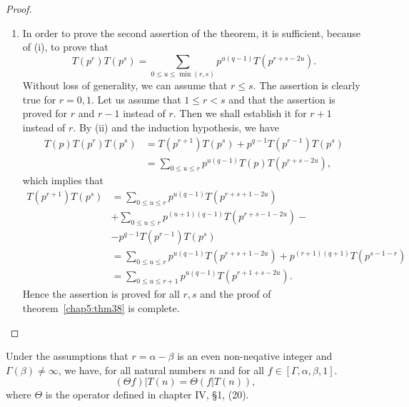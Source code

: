 \begin{proof}
\begin{enumerate}
\item In order \pageoriginale to prove the second assertion of the
  theorem, it is sufficient, because of (i), to prove that 
$$  
T(p^r)T(p^s) =\sum_{0\leq u \leq \min (r,s)} p^{u(q-1)}
T(p^{r+s-2u}). 
$$
Without loss of generality, we can assume that $r\leq s$. The
assertion is clearly true for $r=0,1$. Let us assume that $1\leq r <s$
and that the assertion is proved for $r$ and $r-1$ instead of
$r$. Then we shall establish it for $r+1$ instead of $r$. By (ii) and
the induction hypothesis, we have 
\begin{align*}
T(p) T(p^r) T(p^s) & = T(p^{r+1}) T(p^s) + p^{q-1} T(p^{r-1}) T(p^s)\\
& = \sum_{0\leq u \leq r} p^{u(q-1)} T(p) T (p^{r+s-2u}), 
\end{align*}
which implies that 
\begin{align*}
T(p^{r+1}) T(p^s) & = \sum_{0\leq u \leq r} p^{u(q-1)} T(p^{r+s+1-2u})\\
&+ \sum_{0\leq u \leq r} p^{(u+1)(q-1)} T(p^{r+s-1-2u})-\\
& - p^{q-1} T(p^{r-1}) T(p^s)\\
& = \sum_{0\leq u \leq r} p^{u(q-1)} T(p^{r+s+1-2u}) + p^{(r+1)(q+1)}
T(p^{s-1-r})\\
 & = \sum_{0\leq u \leq r +1} p^{u(q-1)} T(p^{r+1+s-2u}). 
\end{align*}
Hence the assertion is proved for all $r,s$ and the proof of 
theorem~\ref{chap5:thm38} is complete.
\end{enumerate}
\end{proof}

\begin{thm}\label{chap5:thm39}
Under the assumptions that $r=\alpha-\beta$ is an even non-neqative
integer and $\Gamma(\beta)\neq \infty$, we have, for all natural
numbers $n$ and for all $f\in [\Gamma, \alpha,\beta,1]$.
$$
(\Theta f)|T(n) = \Theta (f|T(n)),
$$\pageoriginale 
where $\Theta$ is the operator defined in chapter IV, \S 1, (20). 
\end{thm}

